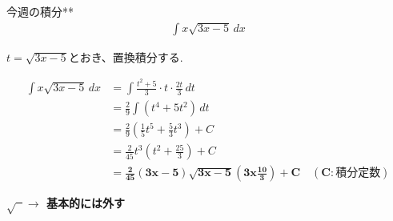 \documentclass[main]{subfiles}
\begin{document}

\begin{mondai}{7}{今週の積分}{**}
    \begin{align*}
        \int x\sqrt{3x-5} \, dx
    \end{align*}
\end{mondai}


\solutionhead
\hfill
$t=\sqrt{3x-5}$とおき、置換積分する.
\hfill\

\begin{align*}
    \int x\sqrt{3x-5} \, dx
        &= \int\frac{t^2+5}{3}\cdot t\cdot \frac{2t}{3} \, dt \\
        &= \frac{2}{9}\int\left(t^4+5t^2\right) \, dt \\
        &= \frac{2}{9}\left(\frac{1}{5}t^5+\frac{5}{3}t^3\right)+C \\
        &= \frac{2}{45}t^3\left(t^2+\frac{25}{3}\right)+C \\
        &= \boldsymbol{\frac{2}{45}\left(3x-5\right)\sqrt{3x-5}\left(3x\frac{10}{3}\right)+C \quad (C:\textbf{積分定数})}
\end{align*}

\begin{focusbox}
\centering
\textbf{$\sqrt{\phantom{x}}\rightarrow$  基本的には外す}
\end{focusbox}
\end{document}
